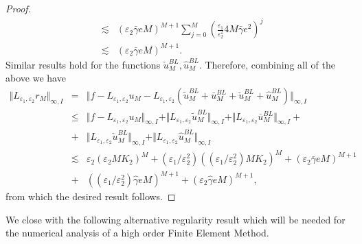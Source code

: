 \documentclass[12pt]{article}
\begin{document}
\begin{proof}
\begin{eqnarray*}
&\lesssim& \left( \varepsilon_2 \bar{\gamma } e M \right) ^{M+1} \sum_{j=0}^M \left(\frac{\varepsilon_1}{\varepsilon^2_2} 4M \bar{\gamma } e^2\right)^j\\
&\lesssim& \left( \varepsilon_2 \bar{\gamma } e M \right) ^{M+1}.
\end{eqnarray*}
Similar results hold for the functions $\check{u}^{BL}_{M}, \hat{u}^{BL}_{M}$. Therefore, combining all of the above we have
%
\begin{eqnarray*}
\Vert L_{\varepsilon_1, \varepsilon_2} r_M \Vert _{\infty ,I} &=& \Vert f - L_{\varepsilon_1, \varepsilon_2} u_M -L_{\varepsilon_1, \varepsilon_2} \left( \tilde{u}_M^{BL} + \bar{u}_M^{BL} + \check{u}_M^{BL} + \hat{u}_{M}^{BL} \right) \Vert _{\infty ,I} \\
&\leq& \Vert f - L_{\varepsilon_1, \varepsilon_2} u_M \Vert _{\infty ,I} + \Vert L_{\varepsilon_1, \varepsilon_2} \tilde{u}_M^{BL} \Vert _{\infty ,I} + \Vert L_{\varepsilon_1, \varepsilon_2} \bar{u}_M^{BL} \Vert _{\infty ,I} + \\
&+& \Vert L_{\varepsilon_1, \varepsilon_2} \check{u}_M^{BL} \Vert _{\infty ,I} + \Vert L_{\varepsilon_1, \varepsilon_2} \hat{u}_M^{BL} \Vert _{\infty ,I} \\
&\lesssim&  \varepsilon_2 (\varepsilon_2 M K_2)^M + (\varepsilon_1 / \varepsilon_2^2) \left( (\varepsilon_1 / \varepsilon_2^2) M K_2 \right) ^M +
 \left( \varepsilon_2 \bar{\gamma } e M \right) ^{M+1} \\
&+& \left( (\varepsilon_1 / \varepsilon_2^2) \hat{\gamma } e M \right) ^{M+1} + \left( \varepsilon_2 \hat{\gamma } e M \right) ^{M+1},
\end{eqnarray*}
%
from which the desired result follows.
\end{proof}


We close with the following alternative regularity result which will be needed for the numerical analysis of a high order Finite Element Method.
\end{document}

